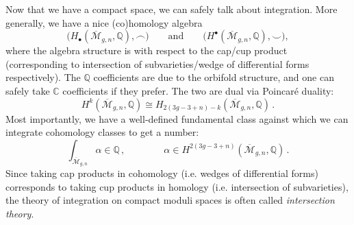 \documentclass[11pt,reqno]{amsart}
\numberwithin{equation}{section}
\newcommand{\mb}[1]{\mathbb{#1}}
\newcommand{\mc}[1]{\mathcal{#1}}
\newcommand{\Q}{\mb{Q}}
\newcommand{\C}{\mb{C}}
\newcommand{\M}{\mc{M}}
\newcommand{\Mbar}{\overline{\M}}
\theoremstyle{plain}
\theoremstyle{definition}
\begin{document}
Now that we have a compact space, we can safely talk about integration. More generally, we have a nice (co)homology algebra
\begin{equation}
  \bigl(
    H_{\bullet}(\Mbar_{g,n},\Q), \frown
  \bigr)
  \qquad\text{and}\qquad
  \bigl(
    H^{\bullet}(\Mbar_{g,n},\Q), \smile
  \bigr) ,
\end{equation}
where the algebra structure is with respect to the cap/cup product (corresponding to intersection of subvarieties/wedge of differential forms respectively). The $\Q$ coefficients are due to the orbifold structure, and one can safely take $\C$ coefficients if they prefer. The two are dual via Poincaré duality:
\begin{equation}
  H^{k}(\Mbar_{g,n},\Q) \cong H_{2(3g-3+n) - k}(\Mbar_{g,n},\Q) \,.
\end{equation}
Most importantly, we have a well-defined fundamental class against which we can integrate cohomology classes to get a number:
\begin{equation}
  \int_{\Mbar_{g,n}} \alpha \in \Q \,,
  \qquad\qquad
  \alpha \in H^{2(3g-3+n)}(\Mbar_{g,n},\Q) \,.
\end{equation}
Since taking cap products in cohomology (i.e. wedges of differential forms) corresponds to taking cup products in homology (i.e. intersection of subvarieties), the theory of integration on compact moduli spaces is often called \emph{intersection theory}.

\end{document}
